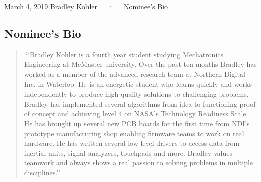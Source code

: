 \documentclass[14pt, a4paper]{awesome-cv}
\begin{document}
\makecvheader[R]

\makecvfooter
  {March 4, 2019}
  {Bradley Kohler~~~·~~~Nominee's Bio}
  {}

\makelettertitle

\begin{cvletter}

\section*{Nominee's Bio}
\begin{center}
\begin{quote}
```Bradley Kohler is a fourth year student studying Mechatronics Engineering at McMaster university.  Over the past ten months Bradley has worked as a member of the advanced research team at Northern Digital Inc. in Waterloo.  He is an energetic student who learns quickly and works independently to produce high-quality solutions to challenging problems. Bradley has implemented several algorithms from idea to functioning proof of concept and achieving level 4 on NASA's Technology Readiness Scale.  He has brought up several new PCB boards for the first time from NDI's prototype manufacturing shop enabling firmware teams to work on real hardware.  He has written several low-level drivers to access data from inertial units, signal analyzers, touchpads and more.  Bradley values teamwork and always shows a real passion to solving problems in multiple disciplines.''
\end{quote}
\end{center}

\end{cvletter}

\end{document}
